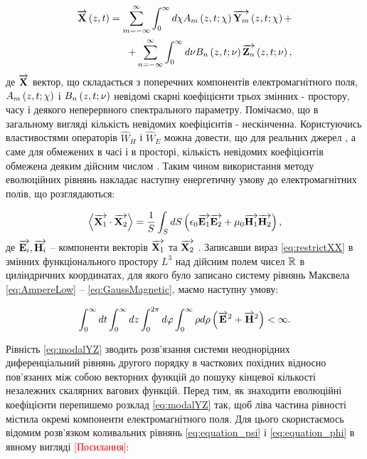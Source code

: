 \begin{equation} \begin{aligned} \label{eq:modalYZ}
\overrightarrow{\mathbf X} \left( z,t \right) = 
\sum_{m=-\infty}^\infty \int_0^\infty d \chi 
A_m \left( z,t;\chi \right) \overrightarrow{\mathbf Y_m} \left( z,t;\chi \right) + \\
+ \sum_{n=-\infty}^\infty \int_0^\infty d \nu 
B_n \left( z,t;\nu \right) \overrightarrow{\mathbf Z_n} \left( z,t;\nu \right),
\end{aligned} \end{equation}
%
де $ \overrightarrow{\mathbf X} $ вектор, що складається з поперечних компонентів 
електромагнітного поля, $ A_m \left( z,t;\chi \right) $ і $ B_n \left( z,t;\nu \right) $ 
невідомі скарні коефіцієнти трьох змінних - простору, часу і деякого 
неперервного спектрального параметру. Помічаємо, що в загальному вигляді 
кількість невідомих коефіцієнтів - нескінченна. Користуючись властивостями 
операторів $ \widehat{W}_H $ і $ \widehat{W}_E $ можна довести, що для 
реальних джерел \cite{imp:Legenkiy2010}, а саме для обмежених в часі і в 
просторі, кількість невідомих коефіцієнтів обмежена деяким дійсним числом
\cite{imp:Tretyakov2004, imp:Tretyakov2010}. Таким чином використання 
методу еволюційних рівнянь накладає наступну енергетичну 
умову до електромагнітних полів, що розглядаються:

\begin{equation} \label{eq:restrictXX}
\left< \overrightarrow{\mathbf X_1} \cdot \overrightarrow{\mathbf X_2} \right> = \frac{1}{S} \int_{S} dS
\left( \epsilon_0 \overrightarrow{\mathbf E_1} \overrightarrow{\mathbf E_2} + \mu_0 \overrightarrow{\mathbf H_1} \overrightarrow{\mathbf H_2} \right),
\end{equation}
%
де $ \overrightarrow{\mathbf E_i}, \overrightarrow{\mathbf H_i} $ -- компоненти векторів $ \overrightarrow{\mathbf X_1} $ та 
$ \overrightarrow{\mathbf X_2} $ . Записавши вираз \eqref{eq:restrictXX} в змінних 
функціонального простору $ L^3 $ над дійсним полем чисел $ \mathbb{R} $ в 
циліндричних координатах, для якого було записано систему рівнянь Максвела 
\eqref{eq:AmpereLow} -- \eqref{eq:GaussMagnetic}, маємо наступну умову:

\begin{equation} \label{eq:energy_restrict}
\int_0^\infty dt \int_0^\infty dz 
\int_0^{2\pi} d\varphi \int_0^\infty \rho d \rho
\left(  \overrightarrow{\mathbf E}^2 + \overrightarrow{\mathbf H}^2 \right) < \infty.
\end{equation}

Рівність \eqref{eq:modalYZ} зводить розв'язання системи неоднорідних 
диференціальний рівнянь другого порядку в часткових похідних  
відносно пов'язаних між собою векторних функцій до пошуку кінцевої кількості 
незалежних скалярних вагових функцій. Перед тим, як знаходити еволюційні 
коефіцієнти перепишемо розклад \eqref{eq:modalYZ} так, щоб ліва 
частина рівності містила окремі компоненти електромагнітного поля. Для цього 
скористаємось відомим розв'язком коливальних рівнянь \eqref{eq:equation_psi} 
і \eqref{eq:equation_phi} в явному вигляді \textcolor{red}{[Посилання]}:

